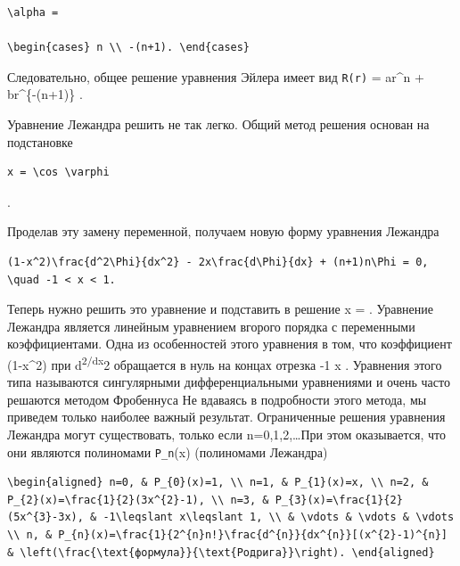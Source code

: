 \documentclass[
  ukrainian,
]{article}
\begin{document}
\begin{verbatim}
\alpha =

\begin{cases} n \\ -(n+1). \end{cases}
\end{verbatim}

Следовательно, общее решение уравнения Эйлера имеет вид \texttt{R(r)} =
ar\^{}n + br\^{}\{-(n+1)\} .

Уравнение Лежандра решить не так легко. Общий метод решения основан на
подстановке

\begin{verbatim}
x = \cos \varphi
\end{verbatim}

.

Проделав эту замену переменной, получаем новую форму уравнения Лежандра

\begin{verbatim}
(1-x^2)\frac{d^2\Phi}{dx^2} - 2x\frac{d\Phi}{dx} + (n+1)n\Phi = 0, \quad -1 < x < 1.
\end{verbatim}

Теперь нужно решить это уравнение и подставить в решение x =
\cos \varphi  . Уравнение Лежандра является линейным уравнением вгорого
порядка с переменными коэффициентами. Одна из особенностей этого
уравнения в том, что коэффициент (1-x\^{}2) при
d\textsuperscript{2\Phi/dx}2 обращается в нуль на концах отрезка -1
\leqslant x  . Уравнения этого типа называются сингулярными
дифференциальными уравнениями и очень часто решаются методом Фробеннуса
Не вдаваясь в подробности этого метода, мы приведем только наиболее
важный результат. Ограниченные решения уравнения Лежандра могут
существовать, только если n=0,1,2,\ldots   При этом оказывается, что они
являются полиномами \texttt{P\_n}(x) (полиномами Лежандра)

\begin{verbatim}
\begin{aligned} n=0, & P_{0}(x)=1, \\ n=1, & P_{1}(x)=x, \\ n=2, & P_{2}(x)=\frac{1}{2}(3x^{2}-1), \\ n=3, & P_{3}(x)=\frac{1}{2}(5x^{3}-3x), & -1\leqslant x\leqslant 1, \\ & \vdots & \vdots & \vdots \\ n, & P_{n}(x)=\frac{1}{2^{n}n!}\frac{d^{n}}{dx^{n}}[(x^{2}-1)^{n}] & \left(\frac{\text{формула}}{\text{Родрига}}\right). \end{aligned}
\end{verbatim}
\end{document}
